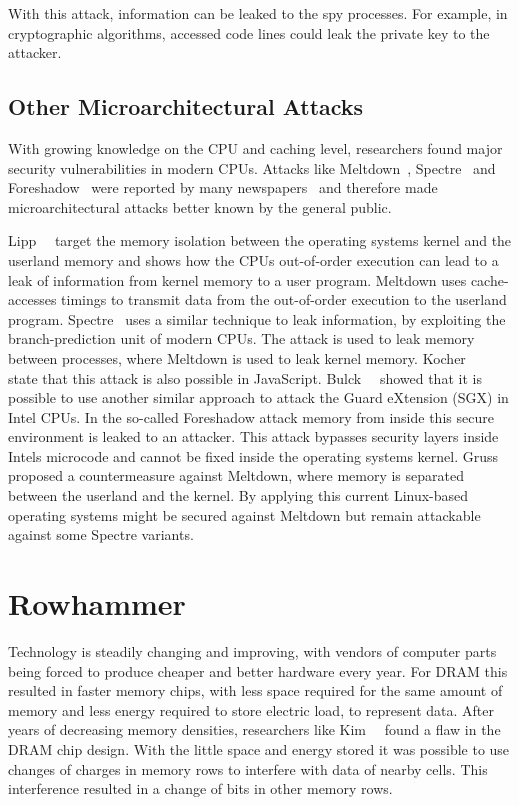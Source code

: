 With this attack, information can be leaked to the spy processes. For example,
in cryptographic algorithms, accessed code lines could leak the private key to
the attacker.

\subsection{Other Microarchitectural Attacks}

With growing knowledge on the CPU and caching level, researchers found major
security vulnerabilities in modern CPUs. Attacks like Meltdown~\cite{meltdown},
Spectre~\cite{spectre} and Foreshadow~\cite{foreshadow} were reported by many
newspapers~\cite{bbcmeltdown, nbcmeltdown} and therefore made microarchitectural
attacks better known by the general public.

Lipp~\etal~\cite{meltdown} target the memory isolation between the operating
system\textquotesingle s kernel and the userland memory and shows how the
CPU\textquotesingle s out-of-order execution can lead to a leak of information
from kernel memory to a user program. Meltdown uses cache-accesses timings to
transmit data from the out-of-order execution to the userland program.
Spectre~\cite{spectre} uses a similar technique to leak information, by
exploiting the branch-prediction unit of modern CPUs. The attack is used to leak
memory between processes, where Meltdown is used to leak kernel memory.
Kocher~\etal~\cite{spectre} state that this attack is also possible in
JavaScript. Bulck~\etal~\cite{foreshadow} showed that it is possible to use
another similar approach to attack the Guard eXtension (SGX) in Intel CPUs. In
the so-called Foreshadow attack memory from inside this secure environment is
leaked to an attacker. This attack bypasses security layers inside
Intel\textquotesingle s microcode and cannot be fixed inside the operating
system\textquotesingle s kernel. Gruss~\etal~\cite{kaiserpaper} proposed a
countermeasure against Meltdown, where memory is separated between the userland
and the kernel. By applying this current Linux-based operating systems might be
secured against Meltdown but remain attackable against some Spectre variants.

\section{Rowhammer}

Technology is steadily changing and improving, with vendors of computer parts
being forced to produce cheaper and better hardware every year. For DRAM this
resulted in faster memory chips, with less space required for the same amount of
memory and less energy required to store electric load, to represent data. After
years of decreasing memory densities, researchers like
Kim~\etal~\cite{rowhammergeneral} found a flaw in the DRAM chip design. With the
little space and energy stored it was possible to use changes of charges in
memory rows to interfere with data of nearby cells. This interference resulted
in a change of bits in other memory rows.

